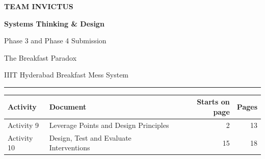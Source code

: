 \documentclass[
  10pt,
  table]{article}
\author{}
\date{}
\begin{document}
\thispagestyle{empty}
\vspace*{1.3in}
\begin{center}
{\color{pblue2}\fontsize{14}{16}\selectfont\bfseries TEAM INVICTUS\par}
\vspace{16pt}
{\color{pblue}\fontsize{32}{38}\selectfont\bfseries Systems Thinking \& Design\par Phase 3 and Phase 4 Submission\par}
\vspace{14pt}
{\color{pslate}\Large The Breakfast Paradox\par}
{\color{pslate}\normalsize IIIT Hyderabad Breakfast Mess System\par}
\vspace{18pt}
{\color{prule}\rule{2.6in}{1.4pt}}
\end{center}
\vspace{22pt}
\begin{center}
\renewcommand{\arraystretch}{1.5}
\footnotesize
\begin{tabular}{@{}p{1.0in}p{3.7in}rr@{}}
\textbf{\color{pblue}Activity} & \textbf{\color{pblue}Document} & \textbf{\color{pblue}Starts on page} & \textbf{\color{pblue}Pages}\\
\hline
Activity 9 & Leverage Points and Design Principles & 2 & 13 \\
Activity 10 & Design, Test and Evaluate Interventions & 15 & 18 \\
\end{tabular}
\end{center}
\end{document}
